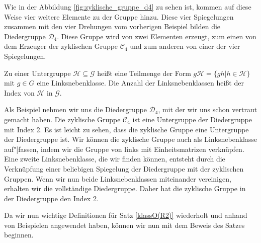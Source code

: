 Wie in der Abbildung \ref{fig:zyklische_gruppe_d4} zu sehen ist, kommen auf diese Weise vier weitere Elemente zu der Gruppe hinzu. Diese vier Spiegelungen zusammen mit den vier Drehungen vom vorherigen Beispiel bilden die Diedergruppe $\mathcal{D}_4$. Diese Gruppe wird von zwei Elementen erzeugt, zum einen von dem Erzeuger der zyklischen Gruppe $\mathcal{C}_4$ und zum anderen von einer der vier Spiegelungen.
\begin{defi}[Linksnebenklasse]
	Zu einer Untergruppe $\mathcal{H} \subseteq \mathcal{G}$ heißt eine Teilmenge der Form $g\mathcal{H} = \{gh|h\in\mathcal{H}\}$ mit $g \in G$ eine Linksnebenklasse. Die Anzahl der Linksnebenklassen heißt der Index von $\mathcal{H}$ in $\mathcal{G}$.
\end{defi}
Als Beispiel nehmen wir uns die Diedergruppe $\mathcal{D}_4$, mit der wir uns schon vertraut gemacht haben. Die zyklische Gruppe $\mathcal{C}_4$ ist eine Untergruppe der Diedergruppe mit Index 2. Es ist leicht zu sehen, dass die zyklische Gruppe eine Untergruppe der Diedergruppe ist. Wir können die zyklische Gruppe auch als Linksnebenklasse auf"|fassen, indem wir die Gruppe von links mit Einheitsmatrizen verknüpfen. Eine zweite Linksnebenklasse, die wir finden können, entsteht durch die Verknüpfung einer beliebigen Spiegelung der Diedergruppe mit der zyklischen Gruppen. Wenn wir nun beide Linksnebenklassen miteinander vereinigen, erhalten wir die vollständige Diedergruppe. Daher hat die zyklische Gruppe in der Diedergruppe den Index 2. \par\smallskip
Da wir nun wichtige Definitionen für Satz \ref{klassO(R2)} wiederholt und anhand von Beispielen angewendet haben, können wir nun mit dem Beweis des Satzes beginnen.
